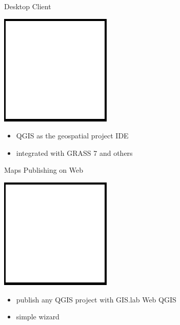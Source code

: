 \documentclass[12pt]{beamer}
\begin{document}
\begin{frame}{Desktop Client}
	\begin{center}
		\includegraphics[keepaspectratio=true,height=0.5\textheight]{images/image.png}
	\end{center}
	\begin{itemize}
		\item QGIS as the geospatial project IDE
		\item integrated with GRASS 7 and others
	\end{itemize}
\end{frame}

\begin{frame}{Maps Publishing on Web}
	\begin{center}
		\includegraphics[keepaspectratio=true,height=0.5\textheight]{images/image.png}
	\end{center}
	\begin{itemize}
		\item publish any QGIS project with GIS.lab Web QGIS
		\item simple wizard
	\end{itemize}
\end{frame}
\end{document}
